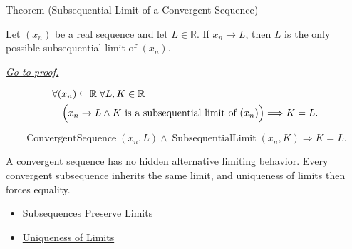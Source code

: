 
\begin{theorembox}{Theorem (Subsequential Limit of a Convergent Sequence)}
\begin{theorem}
\label{thm:subsequential-limit-of-convergent-sequence}
Let $(x_n)$ be a real sequence and let $L\in\mathbb{R}$. If $x_n\to L$,
then $L$ is the only possible subsequential limit of $(x_n)$.

\smallskip
\noindent
\hyperref[prf:subsequential-limit-of-convergent-sequence]{\textit{Go to proof.}}
\end{theorem}
\end{theorembox}

\begin{remark*}
\[
\begin{aligned}
&\forall (x_n)\subseteq\mathbb{R}\;\forall L,K\in\mathbb{R}\\
&\quad\Bigl(
  x_n\to L
  \land
  K\text{ is a subsequential limit of }(x_n)
\Bigr)
\Longrightarrow
K=L.
\end{aligned}
\]
\end{remark*}

\begin{remark*}
\[
\operatorname{ConvergentSequence}(x_n,L)
\land
\operatorname{SubsequentialLimit}(x_n,K)
\Longrightarrow
K=L.
\]
\end{remark*}

\begin{remark*}[Interpretation]
A convergent sequence has no hidden alternative limiting behavior. Every
convergent subsequence inherits the same limit, and uniqueness of limits then
forces equality.
\end{remark*}

\begin{dependencies}
\begin{itemize}
  \item \hyperref[thm:subsequences-preserve-limits]{Subsequences Preserve Limits}
  \item \hyperref[thm:uniqueness-of-limits]{Uniqueness of Limits}
\end{itemize}
\end{dependencies}


